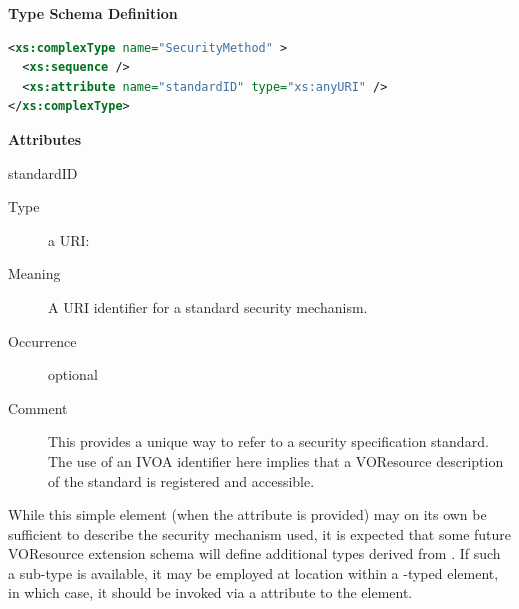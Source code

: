 \documentclass[11pt,a4paper]{ivoa}
\begin{document}

\vspace{1ex}\noindent\textbf{ Type Schema Definition}

\begin{lstlisting}[language=XML,basicstyle=\footnotesize]
<xs:complexType name="SecurityMethod" >
  <xs:sequence />
  <xs:attribute name="standardID" type="xs:anyURI" />
</xs:complexType>
\end{lstlisting}

\vspace{0.5ex}\noindent\textbf{ Attributes}

\begingroup\small\begin{bigdescription}
\item[standardID]
\begin{description}
\item[Type] a URI: 
\item[Meaning] 
               A URI identifier for a standard security mechanism. 
            
\item[Occurrence] optional
\item[Comment] 
               This provides a unique way to refer to a security
               specification standard.  The use of an IVOA identifier here 
               implies that a VOResource description of the standard is 
               registered and accessible.  
            
\end{description}


\end{bigdescription}\endgroup

\endgroup

While this simple element (when the  attribute
is provided) may on its own be sufficient to describe the security
mechanism used, it is expected that some future
VOResource extension schema will define
additional types derived from .  If such
a sub-type is available, it may be employed at
 location within a
-typed element, in which case, it should be
invoked via a  attribute to the
 element.  
\end{document}
